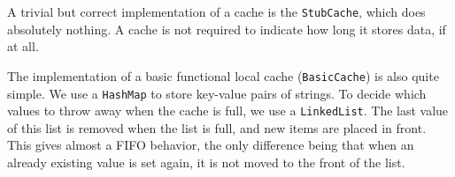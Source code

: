 \documentclass[11pt]{article}
\begin{document}
A trivial but correct implementation of a cache is the \texttt{StubCache}, which does absolutely nothing. A cache is not required to indicate how long it stores data, if at all.

The implementation of a basic functional local cache (\texttt{BasicCache}) is also quite simple. We use a \texttt{HashMap} to store key-value pairs of strings. To decide which values to throw away when the cache is full, we use a \texttt{LinkedList}. The last value of this list is removed when the list is full, and new items are placed in front. This gives almost a FIFO behavior, the only difference being that when an already existing value is set again, it is not moved to the front of the list.
\end{document}
